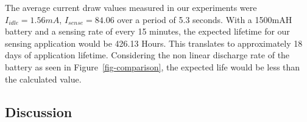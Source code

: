 The average current draw values measured in our experiments were $I_{idle}=1.56mA$, $I_{sense}=84.06$ over a period of 5.3 seconds. With a 1500mAH battery and a sensing rate of every 15 minutes, the expected lifetime for our sensing application would be 426.13 Hours. This translates to approximately 18 days of application lifetime. Considering the non linear discharge rate of the battery as seen in Figure~\ref{fig-comparison}, the expected life would be less than the calculated value.


%

\subsection{Discussion}



